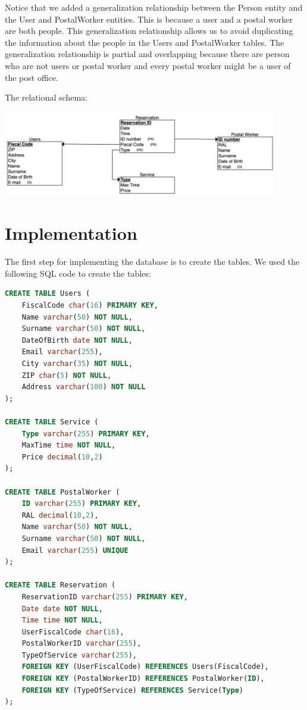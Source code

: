 \documentclass{article}
\begin{document}
Notice that we added a generalization relationship between the Person entity and the User and PostalWorker entities. This is because a user and a postal worker are both people. This generalization relationship allows us to avoid duplicating the information about the people in the Users and PostalWorker tables. The generalization relationship is partial and overlapping because there are person who are not users or postal worker and every postal worker might be a user of the post office.

The relational schema:
\begin{center}
\includegraphics[width=12cm]{images/relationalSchema.png}
\end{center}

\section{Implementation}
The first step for implementing the database is to create the tables. We used the following SQL code to create the tables:

\begin{lstlisting}[language=SQL]
CREATE TABLE Users (
    FiscalCode char(16) PRIMARY KEY,
    Name varchar(50) NOT NULL,
    Surname varchar(50) NOT NULL,
    DateOfBirth date NOT NULL,
    Email varchar(255),
    City varchar(35) NOT NULL,
    ZIP char(5) NOT NULL,
    Address varchar(100) NOT NULL
);

CREATE TABLE Service (
    Type varchar(255) PRIMARY KEY,
    MaxTime time NOT NULL,
    Price decimal(10,2)
);

CREATE TABLE PostalWorker (
    ID varchar(255) PRIMARY KEY,
    RAL decimal(10,2),
    Name varchar(50) NOT NULL,
    Surname varchar(50) NOT NULL,
    Email varchar(255) UNIQUE
);

CREATE TABLE Reservation (
    ReservationID varchar(255) PRIMARY KEY,
    Date date NOT NULL,
    Time time NOT NULL,
    UserFiscalCode char(16),
    PostalWorkerID varchar(255),
    TypeOfService varchar(255),
    FOREIGN KEY (UserFiscalCode) REFERENCES Users(FiscalCode),
    FOREIGN KEY (PostalWorkerID) REFERENCES PostalWorker(ID),
    FOREIGN KEY (TypeOfService) REFERENCES Service(Type)
);
\end{lstlisting}
\end{document}

